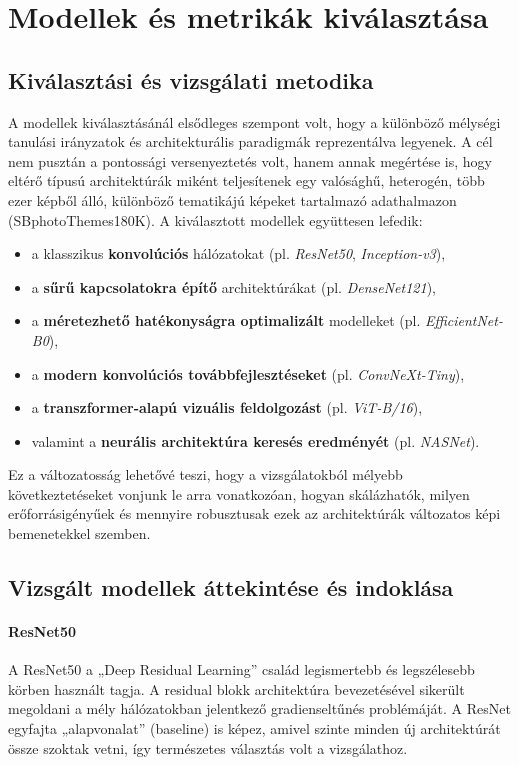 \chapter{Modellek és metrikák kiválasztása}

\section{Kiválasztási és vizsgálati metodika}

A modellek kiválasztásánál elsődleges szempont volt, hogy a különböző mélységi tanulási irányzatok és architekturális paradigmák reprezentálva legyenek. A cél nem pusztán a pontossági versenyeztetés volt, hanem annak megértése is, hogy eltérő típusú architektúrák miként teljesítenek egy valósághű, heterogén, több ezer képből álló, különböző tematikájú képeket tartalmazó adathalmazon (SBphotoThemes180K). A kiválasztott modellek együttesen lefedik:

\begin{itemize}
    \item a klasszikus \textbf{konvolúciós} hálózatokat (pl. \textit{ResNet50}, \textit{Inception-v3}),
    \item a \textbf{sűrű kapcsolatokra építő} architektúrákat (pl. \textit{DenseNet121}),
    \item a \textbf{méretezhető hatékonyságra optimalizált} modelleket (pl. \textit{EfficientNet-B0}),
    \item a \textbf{modern konvolúciós továbbfejlesztéseket} (pl. \textit{ConvNeXt-Tiny}),
    \item a \textbf{transzformer-alapú vizuális feldolgozást} (pl. \textit{ViT-B/16}),
    \item valamint a \textbf{neurális architektúra keresés eredményét} (pl. \textit{NASNet}).
\end{itemize}

Ez a változatosság lehetővé teszi, hogy a vizsgálatokból mélyebb következtetéseket vonjunk le arra vonatkozóan, hogyan skálázhatók, milyen erőforrásigényűek és mennyire robusztusak ezek az architektúrák változatos képi bemenetekkel szemben.

\section{Vizsgált modellek áttekintése és indoklása}

\subsubsection{ResNet50}
A ResNet50 a „Deep Residual Learning” család legismertebb és legszélesebb körben használt tagja. A residual blokk architektúra bevezetésével sikerült megoldani a mély hálózatokban jelentkező gradienseltűnés problémáját. A ResNet egyfajta „alapvonalat” (baseline) is képez, amivel szinte minden új architektúrát össze szoktak vetni, így természetes választás volt a vizsgálathoz.

